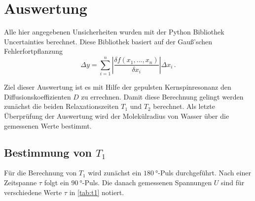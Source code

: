 \section{Auswertung}
\label{sec:Auswertung}

Alle hier angegebenen Unsicherheiten wurden mit der Python Bibliothek Uncertainties berechnet.\cite{uncertainties}
Diese Bibliothek basiert auf der Gauß'schen Fehlerfortpflanzung
\begin{equation}
    \Delta y = \sum_{i=1}^n \left| \frac{\delta f(x_1,...,x_n)}{\delta x_i} \right| \Delta x_i \, .
    \label{eq:fehlerrechnung}
\end{equation}

Ziel dieser Auswertung ist es mit Hilfe der gepulsten Kernspinresonanz den Diffusionskoeffizienten $D$ zu errechnen. 
Damit diese Berechnung gelingt werden zunächst die beiden Relaxationszeiten $T_1$ und $T_2$ berechnet.
Als letzte Überprüfung der Auswertung wird der Molekülradius von Wasser über die gemessenen Werte bestimmt.

\subsection{Bestimmung von $T_1$}
\label{ssec:aus1}

Für die Berechnung von $T_1$ wird zunächst ein $\SI{180}{\degree}$-Puls durchgeführt.
Nach einer Zeitspanne $\tau$ folgt ein $\SI{90}{\degree}$-Puls. 
Die danach gemessenen Spannungen $U$ sind für verschiedene Werte $\tau$ in \autoref{tab:t1} notiert. 

